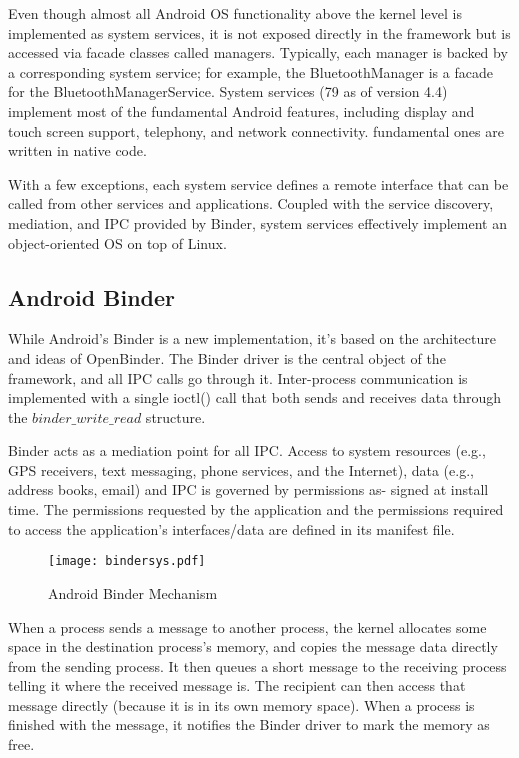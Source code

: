 Even though almost all Android OS functionality above the kernel level is implemented as system services, it is not exposed directly in the framework but is accessed via facade classes called managers. Typically, each manager is backed by a corresponding system service; for example, the BluetoothManager is a facade for the BluetoothManagerService.  System services (79 as of version 4.4) implement most of the fundamental Android features, including display and touch screen support, telephony, and network connectivity. fundamental ones are written in native code.

With a few exceptions, each system service defines a remote interface that can be called from other services and applications. Coupled with the service discovery, mediation, and IPC provided by Binder, system services effectively implement an object-oriented OS on top of Linux.

\subsection*{Android Binder}

While Android’s Binder is a new implementation, it’s based on the architecture and ideas of OpenBinder.
The Binder driver is the central object of the framework, and all IPC calls
go through it. Inter-process communication is implemented with a single ioctl() call that both sends and receives data through the $binder\_write\_read$ structure.

Binder acts as a mediation point for all IPC. Access to system resources (e.g., GPS receivers, text messaging, phone services, and the Internet), data (e.g., address books, email) and IPC is governed by permissions as- signed at install time. The permissions requested by the application and the permissions required to access the application’s interfaces/data are defined in its manifest file.

\begin{figure}[H]
\centering
\texttt{[image: bindersys.pdf]}
\caption{Android Binder Mechanism}
\label{fig:androidmodel}
\end{figure}

When a process sends a message to another process, the kernel allocates some space in the destination process’s memory, and copies the message data directly from the sending process. It then queues a short message to the receiving process telling it where the received message is. The recipient can then access that message directly (because it is in its own memory space). When a process is  finished with the message, it notifies the Binder driver to mark the memory as free.

